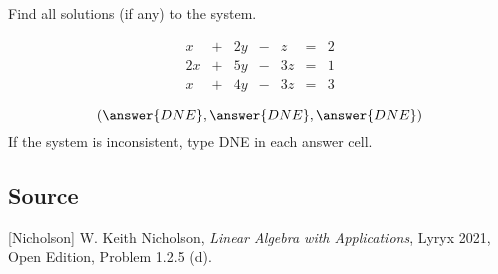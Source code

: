 \documentclass{ximera}
\author{}
\begin{document}
\begin{exercise}
Find all solutions (if any) to the system.  

$$\begin{matrix}
      x& +&2y&-&z&=&2\\
      2x & +&5y&-&3z&= &1\\
      x&+&4y&-&3z&=&3
    \end{matrix}$$

 $$(\answer{DNE}, \answer{DNE}, \answer{DNE})$$
If the system is inconsistent, type DNE in each answer cell.
\end{exercise}

\subsection*{Source}
[Nicholson] W. Keith Nicholson, {\it Linear Algebra with Applications}, Lyryx 2021, Open Edition, Problem 1.2.5 (d).
\end{document}
